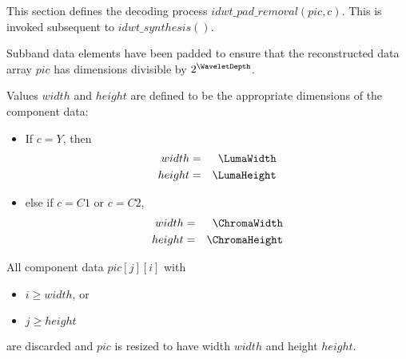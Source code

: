 This section defines the decoding process $idwt\_pad\_removal(pic, c)$. This
is invoked subsequent to $idwt\_synthesis()$.

Subband data elements have been padded to ensure that the reconstructed 
data array $pic$ has dimensions divisible by $2^\WaveletDepth$.

Values $width$ and $height$ are defined to be the appropriate dimensions
of the component data:

\begin{itemize}
\item If $c=Y$, then
\begin{eqnarray*}
width & =& \LumaWidth \\
height & =& \LumaHeight
\end{eqnarray*}
\item else if $c=C1$ or $c=C2$,
\begin{eqnarray*}
width & =& \ChromaWidth \\
height & =& \ChromaHeight
\end{eqnarray*}
\end{itemize}

All component data $pic[j][i]$ with

\begin{itemize}
\item $i\geq width$, or
\item $j\geq height$
\end{itemize}

are discarded and $pic$ is resized to have width $width$ and height $height$.

